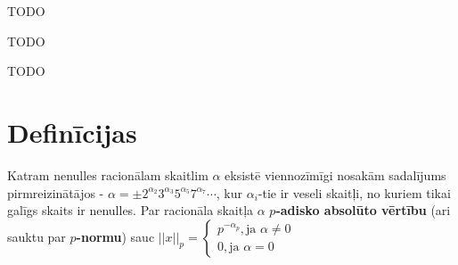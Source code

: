 \documentclass{ludis}
\begin{document}
\maketitle

\begin{abstract-lv}
TODO
\end{abstract-lv}
\clearpage

\begin{abstract-en}
TODO
\end{abstract-en}


\tableofcontents


TODO

\section {Definīcijas}
\begin{definicija}
Katram nenulles racionālam skaitlim $\alpha$ eksistē viennozīmīgi nosakām sadalījums pirmreizinātājos - $\alpha = \pm 2^{\alpha_2}3^{\alpha_3}5^{\alpha_5}7^{\alpha_7} \cdots$, kur $\alpha_i$-tie ir veseli skaitļi, no kuriem tikai galīgs skaits ir nenulles. Par racionāla skaitļa $\alpha$ \textbf{$p$-adisko absolūto vērtību} (ari sauktu par \textbf{$p$-normu}) sauc 
$||x||_p = \begin{cases}
p^{-\alpha_p}, \text{ja } \alpha \neq 0 \\
0, \text{ja } \alpha = 0
\end{cases} $
\end{definicija}
\end{document}
